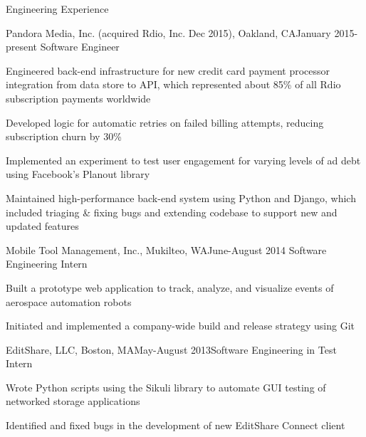 \documentclass{resume} %
\begin{document}

\begin{rSection}{Engineering Experience}

\begin{rSubsection}{Pandora Media, Inc. (acquired Rdio, Inc. Dec 2015), Oakland, CA}{January 2015-present} {Software Engineer}

\item Engineered back-end infrastructure for new credit card payment processor integration from data store to API, which represented about 85\% of all Rdio subscription payments worldwide
\item Developed logic for automatic retries on failed billing attempts, reducing subscription churn by 30\%
\item Implemented an experiment to test user engagement for varying levels of ad debt using Facebook's Planout library
\item Maintained high-performance back-end system using Python and Django, which included triaging \& fixing bugs and extending codebase to support new and updated features
\end{rSubsection}

\begin{rSubsection}{Mobile Tool Management, Inc., Mukilteo, WA}{June-August 2014} {Software Engineering Intern}

\item Built a prototype web application to track, analyze, and visualize events of aerospace automation robots
\item Initiated and implemented a company-wide build and release strategy using Git
\end{rSubsection}


\begin{rSubsection}{EditShare, LLC, Boston, MA}{May-August 2013}{Software Engineering in Test Intern}{}
\item Wrote Python scripts using the Sikuli library to automate GUI testing of networked storage applications
\item Identified and fixed bugs in the development of new EditShare Connect client
\end{rSubsection}

\end{rSection}
\end{document}
